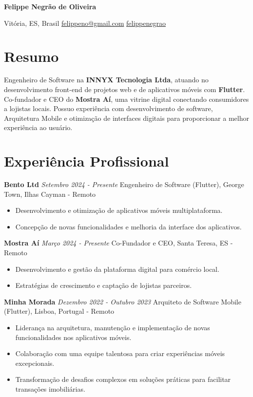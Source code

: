 \documentclass[10pt, letterpaper]{article}
\begin{document}
\begin{center}
    {\fontsize{30 pt}{30 pt} \textbf{Felippe Negrão de Oliveira}}
    
    \vspace{0.3 cm}
    
    {Vitória, ES, Brasil \quad \faEnvelope[regular] \href{mailto:felippeno@gmail.com}{felippeno@gmail.com} \quad \faLinkedin \href{https://linkedin.com/in/felippenegrao}{felippenegrao}} 
\end{center}

\section{Resumo}
Engenheiro de Software na \textbf{INNYX Tecnologia Ltda}, atuando no desenvolvimento front-end de projetos web e de aplicativos móveis com \textbf{Flutter}. Co-fundador e CEO do \textbf{Mostra Aí}, uma vitrine digital conectando consumidores a lojistas locais. Possuo experiência com desenvolvimento de software, Arquitetura Mobile e otimização de interfaces digitais para proporcionar a melhor experiência ao usuário.


\section{Experiência Profissional}
\textbf{Bento Ltd} \hfill \textit{Setembro 2024 - Presente}\newline
Engenheiro de Software (Flutter), George Town, Ilhas Cayman  - Remoto
\begin{itemize}
    \item Desenvolvimento e otimização de aplicativos móveis multiplataforma.
    \item Concepção de novas funcionalidades e melhoria da interface dos aplicativos.
\end{itemize}

\textbf{Mostra Aí} \hfill \textit{Março 2024 - Presente}\newline
Co-Fundador e CEO, Santa Teresa, ES  - Remoto
\begin{itemize}
    \item Desenvolvimento e gestão da plataforma digital para comércio local.
    \item Estratégias de crescimento e captação de lojistas parceiros.
\end{itemize}

\textbf{Minha Morada} \hfill \textit{Dezembro 2022 - Outubro 2023}\newline
Arquiteto de Software Mobile (Flutter), Lisboa, Portugal - Remoto
\begin{itemize}
    \item Liderança na arquitetura, manutenção e implementação de novas funcionalidades nos aplicativos móveis.
    \item Colaboração com uma equipe talentosa para criar experiências móveis excepcionais.
    \item Transformação de desafios complexos em soluções práticas para facilitar transações imobiliárias.
\end{itemize}
\end{document}

